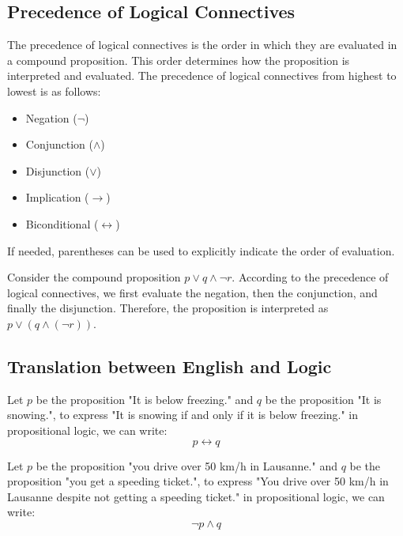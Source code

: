 \subsection{Precedence of Logical Connectives}
\begin{definition}
    The precedence of logical connectives is the order in which they are evaluated in a compound proposition. This order determines how the proposition is interpreted and evaluated. The precedence of logical connectives from highest to lowest is as follows:
    \begin{itemize}[itemsep=1pt,label=$\circ$]
        \item Negation ($\neg$)
        \item Conjunction ($\land$)
        \item Disjunction ($\lor$)
        \item Implication ($\to$) 
        \item Biconditional ($\leftrightarrow$)
    \end{itemize}
    If needed, parentheses can be used to explicitly indicate the order of evaluation.
\end{definition}
\begin{eg}
    Consider the compound proposition \(p \lor q \land \neg r\). According to the precedence of logical connectives, we first evaluate the negation, then the conjunction, and finally the disjunction. Therefore, the proposition is interpreted as \(p \lor (q \land (\neg r))\).
\end{eg}

\subsection{Translation between English and Logic}
\begin{eg}
    Let \(p\) be the proposition "It is below freezing." and \(q\) be the proposition "It is snowing.", to express "It is snowing if and only if it is below freezing." in propositional logic, we can write:
    \[ p \leftrightarrow q \]
\end{eg}
\begin{eg}
    Let \(p\) be the proposition "you drive over 50 km/h in Lausanne." and \(q\) be the proposition "you get a speeding ticket.", to express "You drive over 50 km/h in Lausanne despite not getting a speeding ticket." in propositional logic, we can write:
    \[ \neg p \land q \]
\end{eg}

